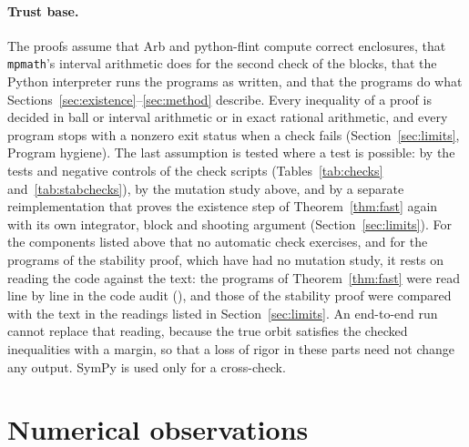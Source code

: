 \documentclass[11pt]{article}
\theoremstyle{definition}
\begin{document}
\paragraph{Trust base.} The proofs assume that Arb and python-flint compute correct enclosures, that \texttt{mpmath}'s interval arithmetic does for the second check of the blocks, that the Python interpreter runs the programs as written, and that the programs do what Sections~\ref{sec:existence}--\ref{sec:method} describe. Every inequality of a proof is decided in ball or interval arithmetic or in exact rational arithmetic, and every program stops with a nonzero exit status when a check fails (Section~\ref{sec:limits}, Program hygiene). The last assumption is tested where a test is possible: by the tests and negative controls of the check scripts (Tables~\ref{tab:checks} and~\ref{tab:stabchecks}), by the mutation study above, and by a separate reimplementation that proves the existence step of Theorem~\ref{thm:fast} again with its own integrator, block and shooting argument (Section~\ref{sec:limits}). For the components listed above that no automatic check exercises, and for the programs of the stability proof, which have had no mutation study, it rests on reading the code against the text: the programs of Theorem~\ref{thm:fast} were read line by line in the code audit (), and those of the stability proof were compared with the text in the readings listed in Section~\ref{sec:limits}. An end-to-end run cannot replace that reading, because the true orbit satisfies the checked inequalities with a margin, so that a loss of rigor in these parts need not change any output. SymPy is used only for a cross-check.

\section{Numerical observations}\label{sec:numerics}
\end{document}
